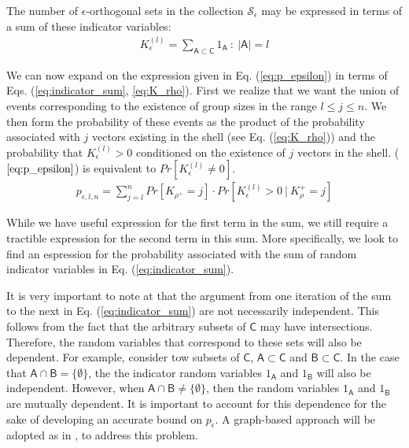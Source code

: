 The number of $\epsilon$-orthogonal sets in the collection $\mathscr{S}_\epsilon$ may be expressed in terms of a sum of these indicator variables:
 \begin{equation}\label{eq:indicator_sum}
    \begin{aligned}
        K_\epsilon^{(l)} = \sum_{\mathsf{A}\subset\mathsf{C}}1_{\mathsf{A}} \ : \ \vert \mathsf{A} \vert = l
    \end{aligned}
\end{equation}

We can now expand on the expression given in Eq. (\ref{eq:p_epsilon}) in terms of Eqs. (\ref{eq:indicator_sum}, \ref{eq:K_rho}). First we realize that we want the union of events corresponding to the existence of group sizes in the range $l\leq j \leq n$. We then form the probability of these events as the product of the probability associated with $j$ vectors existing in the shell (see Eq. (\ref{eq:K_rho})) and the probability that $K_\epsilon^{(l)} > 0$ conditioned on the existence of $j$ vectors in the shell.    ($\ref{eq:p_epsilon}$) is equivalent to $Pr[ K_\epsilon^{(l)} \neq 0]$.
 \begin{equation}\label{eq:p_epsilon_sum}
    \begin{aligned}
        p_{\epsilon,l,n} = \sum_{j=l}^n Pr[K_{\rho^+} = j] \cdot Pr[ K_\epsilon^{(l)} >0 \ \vert \ K_\rho^+ = j]
    \end{aligned}
\end{equation}

While we have useful expression for the first term in the sum, we still require a tractible expression for the second term in this sum. More specifically, we look to find an espression for the probability associated with the sum of random indicator variables in Eq. (\ref{eq:indicator_sum}).

It is very important to note at that the argument from one iteration of the sum to the next in Eq. (\ref{eq:indicator_sum}) are not necessarily independent. This follows from the fact that the arbitrary subsets of $\mathsf{C}$ may have intersections. Therefore, the random variables that correspond to these sets will also be dependent. For example, consider tow subsets of $\mathsf{C}$, $\mathsf{A}\subset\mathsf{C}$ and $\mathsf{B}\subset\mathsf{C}$. In the case that $\mathsf{A}\cap\mathsf{B} = \lbrace \emptyset \rbrace$, the the indicator random variables $1_{\mathsf{A}}$ and $1_\mathsf{B}$ will also be independent. However, when $\mathsf{A}\cap\mathsf{B} \neq \lbrace \emptyset \rbrace$, then the random variables $1_{\mathsf{A}}$ and $1_\mathsf{B}$ are mutually dependent. It is important to account for this dependence for the sake of developing an accurate bound on $p_\epsilon$. A graph-based approach will be adopted as in \cite{Swannack2005}, \cite{Janson2004} to address this problem.